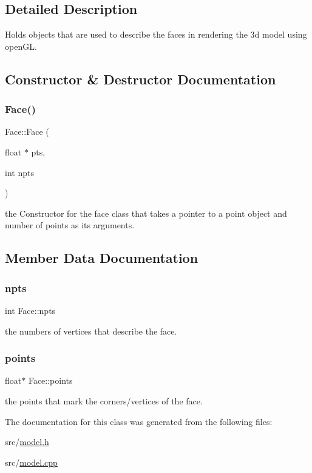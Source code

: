 \subsection{Detailed Description}
Holds objects that are used to describe the faces in rendering the 3d model using open\+GL. 

\subsection{Constructor \& Destructor Documentation}
\mbox{\label{class_face_a890f52c15855e434e6c0f853bcf7f40d}} 
\subsubsection{\texorpdfstring{Face()}{Face()}}
{\footnotesize\ttfamily Face\+::\+Face (\begin{DoxyParamCaption}\item[{float $\ast$}]{pts,  }\item[{int}]{npts }\end{DoxyParamCaption})}



the Constructor for the face class that takes a pointer to a point object and number of points as its arguments. 



\subsection{Member Data Documentation}
\mbox{\label{class_face_ac35360914de7ce1903058a598b9fe7ab}} 
\subsubsection{\texorpdfstring{npts}{npts}}
{\footnotesize\ttfamily int Face\+::npts}



the numbers of vertices that describe the face. 

\mbox{\label{class_face_a402240ad45f918a772d83f3022f9589f}} 
\subsubsection{\texorpdfstring{points}{points}}
{\footnotesize\ttfamily float$\ast$ Face\+::points}



the points that mark the corners/vertices of the face. 



The documentation for this class was generated from the following files\+:\begin{DoxyCompactItemize}
\item 
src/\mbox{\hyperlink{model_8h}{model.\+h}}\item 
src/\mbox{\hyperlink{model_8cpp}{model.\+cpp}}\end{DoxyCompactItemize}
